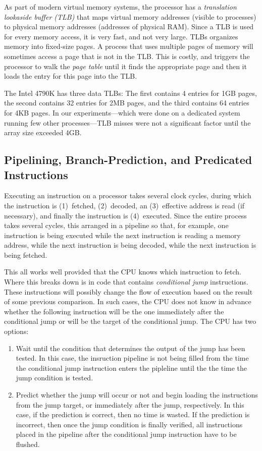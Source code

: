 \documentclass{patmorin}
\begin{document}
As part of modern virtual memory systems, the processor has a
\emph{translation lookaside buffer (TLB)} that maps virtual memory
addresses (visible to processes) to physical memory addresses (addresses
of physical RAM).  Since a TLB is used for every memory access, it is very
fast, and not very large.  TLBs organizes memory into fixed-size pages.
A process that uses multiple pages of memory will sometimes access a
page that is not in the TLB. This is costly, and triggers the processor
to walk the \emph{page table} until it finds the appropriate page and
then it loads the entry for this page into the TLB.

The Intel 4790K has three data TLBs: The first contains 4 entries for
1GB pages, the second contains 32 entries for 2MB pages, and the third
contains 64 entries for 4KB pages.  In our experiments---which were done
on a dedicated system running few other processes---TLB misses were not
a significant factor until the array size exceeded 4GB.



\subsection{Pipelining, Branch-Prediction, and Predicated Instructions}

Executing an instruction on a processor takes several clock cycles, during
which the instruction is (1)~fetched, (2)~decoded, an (3)~effective
address is read (if necessary), and finally the instruction is
(4)~executed.  Since the entire process takes several cycles, this
arranged in a pipeline so that, for example, one instruction is being
executed while the next instruction is reading a memory address, while
the next instruction is being decoded, while the next instruction is
being fetched.

This all works well provided that the CPU knows which instruction to
fetch.  Where this breaks down is in code that contains \emph{conditional
jump} instructions. These instructions will possibly change the flow of
execution based on the result of some previous comparison.  In such cases,
the CPU does not know in advance whether the following instruction will
be the one immediately after the conditional jump or will be the target
of the conditional jump. The CPU has two options: 
\begin{enumerate}
\item Wait until the condition that determines the output
 of the jump has been tested. In this case, the insruction pipeline is
 not being filled from the time the conditional jump instruction enters
 the pipleline until the the time the jump condition is tested.

\item Predict whether the jump will occur or not and begin loading
the instructions from the jump target, or immediately after the jump,
respectively.  In this case, if the prediction is correct, then no time
is wasted. If the prediction is incorrect, then once the jump condition
is finally verified, all instructions placed in the pipeline after the
conditional jump instruction have to be flushed.
\end{enumerate}
\end{document}
